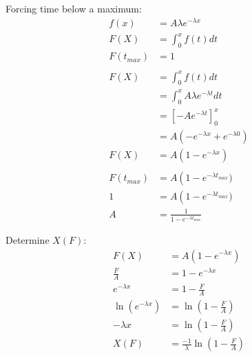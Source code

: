 \documentclass[12pt]{article}
\begin{document}
Forcing time below a maximum:
\begin{align*}
	f(x) &= A \lambda e^{-\lambda x} \\
	F(X) &= \int_{0}^{x} f(t) dt \\
	F(t_{max}) &= 1 \\
	\\
	F(X) &= \int_{0}^{x} f(t) dt \\
		&= \int_{0}^{x} A \lambda e^{-\lambda t} dt \\
		&= \left[-A e^{-\lambda t}\right]_{0}^{x} \\
		&= A\left(-e^{-\lambda x} + e^{-\lambda 0}\right) \\
	F(X) &= A\left(1 - e^{-\lambda x}\right) \\
	\\
	F(t_{max}) &= A\left(1 - e^{-\lambda t_{max}}) \\
	1 &= A\left(1 - e^{-\lambda t_{max}}) \\
	A &= \frac{1}{1 - e^{-\lambda t_{max}}}
\end{align*}

Determine $X(F)$:
\begin{align*}
	F(X) &= A\left(1 - e^{-\lambda x}\right) \\
	\frac{F}{A} &= 1 - e^{-\lambda x} \\
	e^{-\lambda x} &= 1 - \frac{F}{A} \\
	\ln\left(e^{-\lambda x}\right) &= \ln\left(1 - \frac{F}{A}\right) \\
	-\lambda x &= \ln\left(1 - \frac{F}{A}\right) \\
	X(F) &= \frac{-1}{\lambda}\ln\left(1 - \frac{F}{A}\right) \\
\end{align*}
\end{document}
